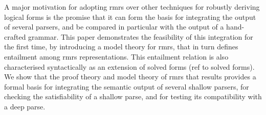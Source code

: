 {A major motivation for adopting {\sc rmrs} over other techniques for
robustly deriving logical forms is the promise that it can form the
basis for integrating the output of several parsers, and be compared
in particular with the output of a hand-crafted grammar.  This paper
demonstrates the feasibility of this integration for the first time,
by introducing a model theory for {\sc rmrs}, that in turn defines
entailment among {\sc rmrs} representations.  This entailment relation
is also characterised syntactically as an extension of solved forms
(ref to solved forms).  We show that the proof theory and model theory
of {\sc rmrs} that results provides a formal basis for integrating the
semantic output of several shallow parsers, for checking the
satisfiability of a shallow parse, and for testing its compatibility
with a deep parse.


}

